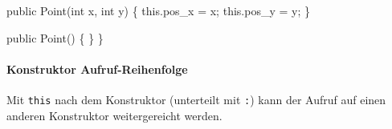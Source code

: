 \documentclass[
  9pt,
  a4paperpaper,
  DIV=11]{scrartcl}
\let\oldparagraph\paragraph
\renewcommand{\paragraph}[1]{\oldparagraph{#1}\mbox{}}
\newenvironment{Shaded}{}{}
\newcommand{\DataTypeTok}[1]{\textcolor[rgb]{0.84,0.23,0.29}{#1}}
\newcommand{\DecValTok}[1]{\textcolor[rgb]{0.00,0.36,0.77}{#1}}
\newcommand{\FunctionTok}[1]{\textcolor[rgb]{0.44,0.26,0.76}{#1}}
\newcommand{\KeywordTok}[1]{\textcolor[rgb]{0.84,0.23,0.29}{#1}}
\newcommand{\NormalTok}[1]{\textcolor[rgb]{0.14,0.16,0.18}{#1}}
\newcommand{\OperatorTok}[1]{\textcolor[rgb]{0.14,0.16,0.18}{#1}}
\newcommand{\StringTok}[1]{\textcolor[rgb]{0.01,0.18,0.38}{#1}}
\numberwithin{equation}{section}
\begin{document}
\begin{multicols}{2}
\begin{tcolorbox}
\begin{tcolorbox}
\begin{tcolorbox}
\begin{tcolorbox}
\begin{tcolorbox}
\begin{tcolorbox}
\begin{Shaded}
\begin{Highlighting}[]
  \KeywordTok{public} \FunctionTok{Point}\OperatorTok{(}\DataTypeTok{int}\NormalTok{ x}\OperatorTok{,} \DataTypeTok{int}\NormalTok{ y}\OperatorTok{)} \OperatorTok{\{}
    \KeywordTok{this}\OperatorTok{.}\FunctionTok{pos\_x} \OperatorTok{=}\NormalTok{ x}\OperatorTok{;}
    \KeywordTok{this}\OperatorTok{.}\FunctionTok{pos\_y} \OperatorTok{=}\NormalTok{ y}\OperatorTok{;}
  \OperatorTok{\}}

  \KeywordTok{public} \FunctionTok{Point}\OperatorTok{()} \OperatorTok{\{} \OperatorTok{\}}
\OperatorTok{\}}
\end{Highlighting}
\end{Shaded}

\hypertarget{konstruktor-aufruf-reihenfolge}{%
\paragraph{Konstruktor
Aufruf-Reihenfolge}\label{konstruktor-aufruf-reihenfolge}}

Mit \texttt{this} nach dem Konstruktor (unterteilt mit \texttt{:}) kann
der Aufruf auf einen anderen Konstruktor weitergereicht werden.

\begin{Shaded}
\end{Shaded}
\end{tcolorbox}
\end{tcolorbox}
\end{tcolorbox}
\end{tcolorbox}
\end{tcolorbox}
\end{tcolorbox}
\end{multicols}
\end{document}

